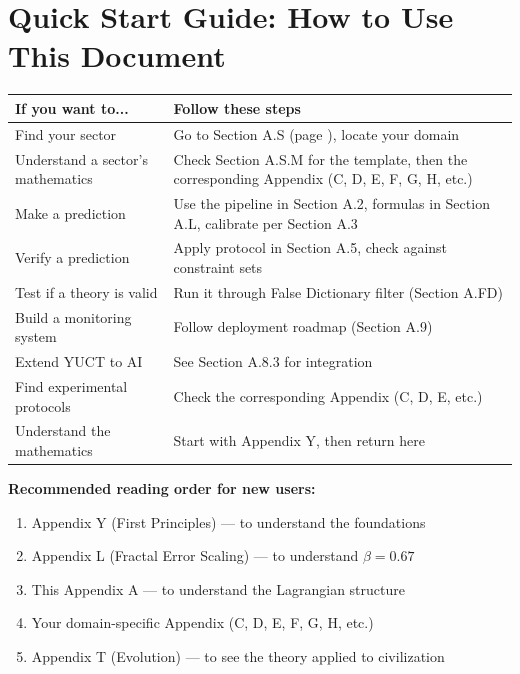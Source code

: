 \documentclass[13pt,a4paper]{article}
\begin{document}
	\section*{Quick Start Guide: How to Use This Document}
	
	\begin{tabularx}{\textwidth}{|p{3.5cm}|X|}
		\hline
		\textbf{If you want to...} & \textbf{Follow these steps} \\
		\hline
		Find your sector & Go to Section A.S (page \pageref{sec:sector-catalog}), locate your domain \\
		\hline
		Understand a sector's mathematics & Check Section A.S.M for the template, then the corresponding Appendix (C, D, E, F, G, H, etc.) \\
		\hline
		Make a prediction & Use the pipeline in Section A.2, formulas in Section A.L, calibrate per Section A.3 \\
		\hline
		Verify a prediction & Apply protocol in Section A.5, check against constraint sets \\
		\hline
		Test if a theory is valid & Run it through False Dictionary filter (Section A.FD) \\
		\hline
		Build a monitoring system & Follow deployment roadmap (Section A.9) \\
		\hline
		Extend YUCT to AI & See Section A.8.3 for integration \\
		\hline
		Find experimental protocols & Check the corresponding Appendix (C, D, E, etc.) \\
		\hline
		Understand the mathematics & Start with Appendix Y, then return here \\
		\hline
	\end{tabularx}
	
	\vspace{0.5cm}
	\noindent\textbf{Recommended reading order for new users:}
	\begin{enumerate}
		\item Appendix Y (First Principles) — to understand the foundations
		\item Appendix L (Fractal Error Scaling) — to understand \(\beta = 0.67\)
		\item This Appendix A — to understand the Lagrangian structure
		\item Your domain-specific Appendix (C, D, E, F, G, H, etc.)
		\item Appendix T (Evolution) — to see the theory applied to civilization
	\end{enumerate}
	
\end{document}
